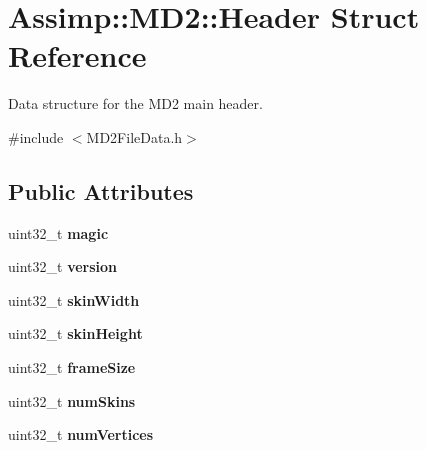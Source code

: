 \hypertarget{struct_assimp_1_1_m_d2_1_1_header}{\section{Assimp\+:\+:M\+D2\+:\+:Header Struct Reference}
\label{struct_assimp_1_1_m_d2_1_1_header}
}


Data structure for the M\+D2 main header.  




{\ttfamily \#include $<$M\+D2\+File\+Data.\+h$>$}

\subsection*{Public Attributes}
\begin{DoxyCompactItemize}
\item 
\hypertarget{struct_assimp_1_1_m_d2_1_1_header_af1d71038d72100711e303130341a350f}{uint32\+\_\+t {\bfseries magic}}\label{struct_assimp_1_1_m_d2_1_1_header_af1d71038d72100711e303130341a350f}

\item 
\hypertarget{struct_assimp_1_1_m_d2_1_1_header_a2a412cb8d9cbaa25f0a9b2b0646d5ab1}{uint32\+\_\+t {\bfseries version}}\label{struct_assimp_1_1_m_d2_1_1_header_a2a412cb8d9cbaa25f0a9b2b0646d5ab1}

\item 
\hypertarget{struct_assimp_1_1_m_d2_1_1_header_a5f3eab708b28e6e3e9173ed8e2bdeef6}{uint32\+\_\+t {\bfseries skin\+Width}}\label{struct_assimp_1_1_m_d2_1_1_header_a5f3eab708b28e6e3e9173ed8e2bdeef6}

\item 
\hypertarget{struct_assimp_1_1_m_d2_1_1_header_a8a1cd165c293aa96efc15d7328d4a16e}{uint32\+\_\+t {\bfseries skin\+Height}}\label{struct_assimp_1_1_m_d2_1_1_header_a8a1cd165c293aa96efc15d7328d4a16e}

\item 
\hypertarget{struct_assimp_1_1_m_d2_1_1_header_a4c7d6669bdedc4dc0a6aa854dc1e4429}{uint32\+\_\+t {\bfseries frame\+Size}}\label{struct_assimp_1_1_m_d2_1_1_header_a4c7d6669bdedc4dc0a6aa854dc1e4429}

\item 
\hypertarget{struct_assimp_1_1_m_d2_1_1_header_a7fd6e910fa3ae399ca212ade5ad31e23}{uint32\+\_\+t {\bfseries num\+Skins}}\label{struct_assimp_1_1_m_d2_1_1_header_a7fd6e910fa3ae399ca212ade5ad31e23}

\item 
\hypertarget{struct_assimp_1_1_m_d2_1_1_header_a64c97a3e169e62c2699c608344b24a23}{uint32\+\_\+t {\bfseries num\+Vertices}}\label{struct_assimp_1_1_m_d2_1_1_header_a64c97a3e169e62c2699c608344b24a23}


\end{DoxyCompactItemize}
